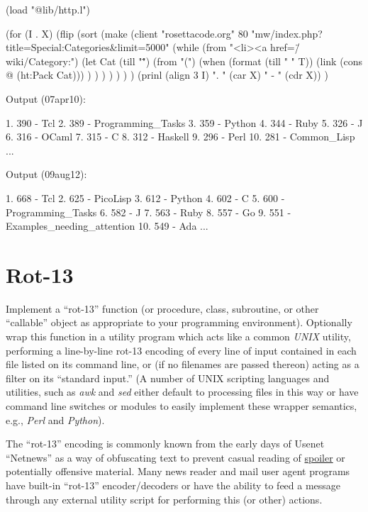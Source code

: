 \begin{wideverbatim}

(load "@lib/http.l")

(for (I . X)
   (flip
      (sort
         (make
            (client "rosettacode.org" 80
               "mw/index.php?title=Special:Categories\&limit=5000"
               (while (from "<li><a href=\"/wiki/Category:")
                  (let Cat (till "\"")
                     (from "(")
                     (when (format (till " " T))
                        (link (cons @ (ht:Pack Cat))) ) ) ) ) ) ) )
   (prinl (align 3 I) ". " (car X) " - " (cdr X)) )

Output (07apr10):

  1. 390 - Tcl
  2. 389 - Programming_Tasks
  3. 359 - Python
  4. 344 - Ruby
  5. 326 - J
  6. 316 - OCaml
  7. 315 - C
  8. 312 - Haskell
  9. 296 - Perl
 10. 281 - Common_Lisp
...


Output (09aug12):

  1. 668 - Tcl
  2. 625 - PicoLisp
  3. 612 - Python
  4. 602 - C
  5. 600 - Programming_Tasks
  6. 582 - J
  7. 563 - Ruby
  8. 557 - Go
  9. 551 - Examples_needing_attention
 10. 549 - Ada
...

\end{wideverbatim}

\pagebreak{}
\section*{Rot-13}

Implement a ``rot-13'' function (or procedure, class, subroutine, or
other ``callable'' object as appropriate to your programming
environment). Optionally wrap this function in a utility program which
acts like a common \emph{UNIX} utility, performing a
line-by-line rot-13 encoding of every line of input contained in each
file listed on its command line, or (if no filenames are passed thereon)
acting as a filter on its ``standard input.'' (A number of UNIX
scripting languages and utilities, such as \emph{awk} and \emph{sed}
either default to processing files in this way or have command line
switches or modules to easily implement these wrapper semantics, e.g.,
\emph{Perl} and \emph{Python}).

The ``rot-13'' encoding is commonly known from the early days of Usenet
``Netnews'' as a way of obfuscating text to prevent casual reading of
\href{http://en.wikipedia.org/wiki/Spoiler\_(media)}{spoiler} or
potentially offensive material. Many news reader and mail user agent
programs have built-in ``rot-13'' encoder/decoders or have the ability
to feed a message through any external utility script for performing
this (or other) actions.

